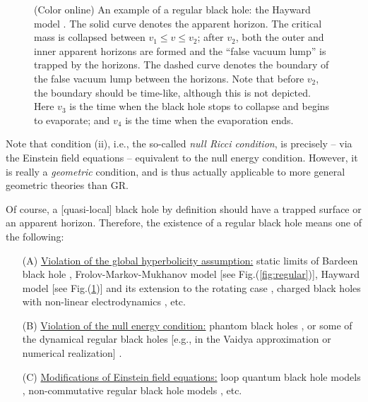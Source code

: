 \documentclass[12pt]{article}
\newcommand{\2}{$^2$}
\newcommand{\3}{$^3$}
\newcommand{\4}{$_4$}
\newcommand{\5}{$_5$}
\begin{document}
\begin{figure}
\begin{center}
\caption{\label{fig:regular_2}(Color online) An example of a regular black hole: the Hayward model \cite{Hayward:2005gi}. The solid curve denotes the apparent horizon. The critical mass is collapsed between $v_{1} \leqslant v \leqslant v_{2}$; after $v_{2}$, both the outer and inner apparent horizons are formed and the ``false vacuum lump'' is trapped by the horizons. The  dashed curve denotes the boundary of the false vacuum lump between the  horizons. Note that before $v_{2}$, the boundary should be time-like, although this is not depicted. Here $v_{3}$ is the time when the black hole stops to collapse and begins to evaporate; and $v_{4}$ is the time when the evaporation ends.}
\end{center}
\end{figure}


Note that condition (ii), i.e., the so-called \emph{null Ricci condition}, is precisely -- via the Einstein field equations -- equivalent to the null energy condition. However, it is really a \emph{geometric} condition, and is thus actually applicable to more general geometric theories than GR. 

Of course, a [quasi-local] black hole by definition should have a trapped surface or an apparent horizon. Therefore, the existence of a regular black hole means one of the following:
\begin{itemize}
\item[(A)] \underline{Violation of the global hyperbolicity assumption:} static limits of Bardeen black hole \cite{Bardeen}, Frolov-Markov-Mukhanov model [see Fig.(\ref{fig:regular})]\cite{Frolov:1988vj}, Hayward model \cite{Hayward:2005gi} [see Fig.(\ref{fig:regular_2})] and its extension to the rotating case \cite{1410.4043}, charged black holes with non-linear electrodynamics \cite{AyonBeato:1999rg}, etc.
\item[(B)] \underline{Violation of the null energy condition:} phantom black holes \cite{Bronnikov:2005gm}, or some of the dynamical regular black holes [e.g., in the Vaidya approximation or numerical realization] \cite{Hayward:2005gi}.
\item[(C)] \underline{Modifications of Einstein field equations:} loop quantum black hole models \cite{Modesto:2005zm}, non-commutative regular black hole models \cite{Nicolini:2005vd}, etc.  
\end{itemize}
\end{document}
